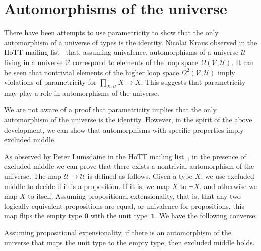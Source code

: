 \documentclass[a4paper,UKenglish]{lipics-v2016}
\newcommand{\UU}{\mathcal{U}}
\newcommand{\Empty}{\mathbf{0}}
\newcommand{\unit}{\mathbf{1}}
\begin{document}
\section{Automorphisms of the universe}

There have been attempts to use parametricity to show that the only
automorphism of a universe of types is the identity.  Nicolai Kraus
observed in the HoTT mailing list~\cite{automorphisms:kraus} that,
assuming univalence, automorphisms of a universe $\UU$ living in a
universe $\mathcal{V}$ correspond to elements of the loop space
$\Omega(\mathcal{V},\UU)$.  It can be seen that nontrivial elements of
the higher loop space $\Omega^2(\mathcal{V},\UU)$ imply violations of
parametricity for $\prod_{X : \UU} X \to X$.  This suggests that
parametricity may play a role in automorphisms of the universe.

We are not aware of a proof that parametricity implies that the only
automorphism of the universe is the identity. However, in the spirit
of the above development, we can show that automorphisms with specific
properties imply excluded middle.

As observed by Peter Lumsdaine in the HoTT mailing
list~\cite{automorphisms:lumsdaine:lem}, in the presence of excluded
middle we can prove that there exists a nontrivial automorphism of the
universe.  The map $\UU\to\UU$ is defined as follows.  Given a type
$X$, we use excluded middle to decide if it is a proposition.  If it
is, we map $X$ to $\neg X$, and otherwise we map $X$ to itself.
Assuming propositional extensionality, that is, that any two logically
equivalent propositions are equal, or univalence for propositions,
this map flips the empty type $\Empty$ with the unit type~$\unit$.
We have the following converse:
\begin{theorem}
\label{thm:automorphism}
Assuming propositional extensionality, if there is an automorphism of the
universe that maps the unit type to the empty type, then excluded middle
holds.
\end{theorem}%
\end{document}
